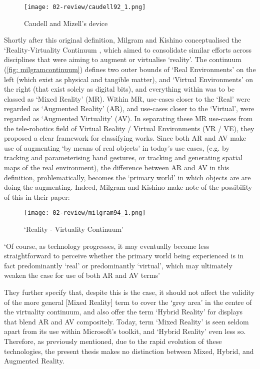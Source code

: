 \begin{figure}[bth]
    \myfloatalign
    {\texttt{[image: 02-review/caudell92\_1.png]}}
    \caption[Caudell and Mizell's device]{Caudell and Mizell's device}\label{fig: caudellprivateeye}
\end{figure}

Shortly after this original definition, Milgram and Kishino conceptualised the `Reality-Virtuality Continuum \citeyearpar{milgram1994}, which aimed to consolidate similar efforts across disciplines that were aiming to augment or virtualise `reality'. The continuum (\autoref{fig: milgramcontinuum}) defines two outer bounds of `Real Environments' on the left (which exist as physical and tangible matter), and `Virtual Environments' on the right (that exist solely as digital bits), and everything within was to be classed as `Mixed Reality' (MR). Within MR, use-cases closer to the `Real' were regarded as `Augmented Reality' (AR), and use-cases closer to the `Virtual', were regarded as `Augmented Virtuality' (AV). In separating these MR use-cases from the tele-robotics field of Virtual Reality / Virtual Environments (VR / VE), they proposed a clear framework for classifying works. Since both AR and AV make use of augmenting `by means of real objects' in today's use cases, (e.g. by tracking and parameterising hand gestures, or tracking and generating spatial maps of the real environment), the difference between AR and AV in this definition, problematically, becomes the `primary world' in which objects are are doing the augmenting. Indeed, Milgram and Kishino make note of the possibility of this in their paper: 

\begin{figure}[bth]
    \myfloatalign
    {\texttt{[image: 02-review/milgram94\_1.png]}}
    \caption[`Reality - Virtuality Continuum']{`Reality - Virtuality Continuum'}\label{fig: milgramcontinuum}
\end{figure}

`Of course, as technology progresses, it may eventually become less straightforward to perceive whether the primary world being experienced is in fact predominantly `real' or predominantly `virtual', which may ultimately weaken the case for use of both AR and AV terms'

They further specify that, despite this is the case, it should not affect the validity of the more general [Mixed Reality] term to cover the `grey area' in the centre of the virtuality continuum, and also offer the term `Hybrid Reality' for displays that blend AR and AV compositely. Today, term `Mixed Reality' is seen seldom apart from its use within Microsoft's toolkit, and `Hybrid Reality' even less so. Therefore, as previously mentioned, due to the rapid evolution of these technologies, the present thesis makes no distinction between Mixed, Hybrid, and Augmented Reality.

